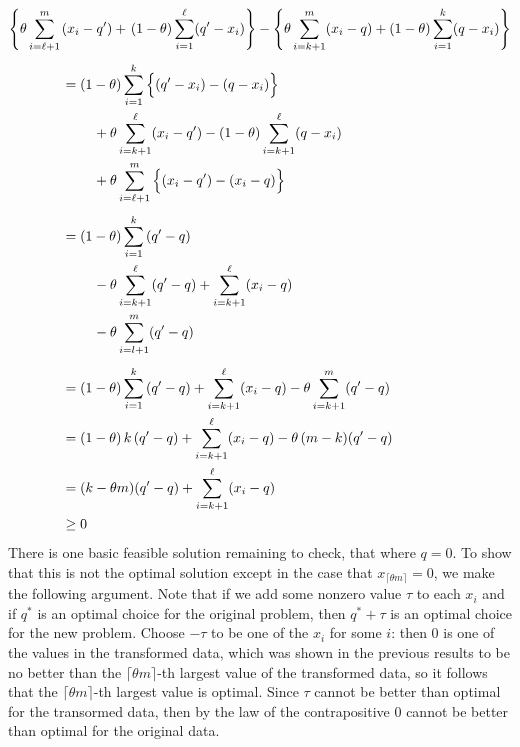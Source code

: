 \begin{align*} 
  \left\{ \theta \sum_{i=\ell+1}^m \right.
  & (x_i - q^{\prime}) +
    \left. (1 - \theta) \sum_{i=1}^{\ell} (q^{\prime} - x_i) \right\} -
    \left\{ \theta \sum_{i=k+1}^m (x_i - q) +
    (1 - \theta) \sum_{i=1}^k (q - x_i) \right\} \\[1ex]
  &= (1 - \theta) \sum_{i=1}^k \Big\{ (q^{\prime} - x_i) - (q - x_i) \Big\} \\
  &\hspace{8mm}
    + \theta \sum_{i=k+1}^{\ell} (x_i - q^{\prime})
    - (1 - \theta) \sum_{i=k+1}^{\ell} (q - x_i) \\
  &\hspace{8mm}
    + \theta \sum_{i=\ell+1}^m \Big\{ (x_i - q^{\prime})
    - (x_i - q) \Big\} \\[1ex]
  &= (1 - \theta) \sum_{i=1}^k\, (q^{\prime} - q) \\
  &\hspace{8mm}
    - \theta \sum_{i=k+1}^{\ell} (q^{\prime} - q)
    + \sum_{i=k+1}^{\ell} (x_i - q) \\
  &\hspace{8mm}
    - \theta \sum_{i=l+1}^m (q^{\prime} - q) \\[1ex]
  &= (1 - \theta) \sum_{i=1}^k\, (q^{\prime} - q)
    + \sum_{i=k+1}^{\ell} (x_i - q)
    - \theta \sum_{i=k+1}^m (q^{\prime} - q) \\
  &= (1 - \theta)\, k\, (q^{\prime} - q)
    + \sum_{i=k+1}^{\ell} (x_i - q)
    - \theta\, (m - k) (q^{\prime} - q) \\
  &= (k - \theta m) (q^{\prime} - q) + \sum_{i=k+1}^{\ell} (x_i - q) \\
  &\geq 0
\end{align*}
There is one basic feasible solution remaining to check, that where $q = 0$.  To
show that this is not the optimal solution except in the case that
$x_{\lceil \theta m \rceil} = 0$, we make the following argument.  Note that if
we add some nonzero value $\tau$ to each $x_i$ and if $q^{*}$ is an optimal
choice for the original problem, then $q^{*} + \tau$ is an optimal choice for
the new problem.  Choose $-\tau$ to be one of the $x_i$ for some $i$: then 0 is
one of the values in the transformed data, which was shown in the previous
results to be no better than the $\lceil \theta m \rceil$-th largest value of
the transformed data, so it follows that the $\lceil \theta m \rceil$-th largest
value is optimal.  Since $\tau$ cannot be better than optimal for the transormed
data, then by the law of the contrapositive 0 cannot be better than optimal for
the original data.




